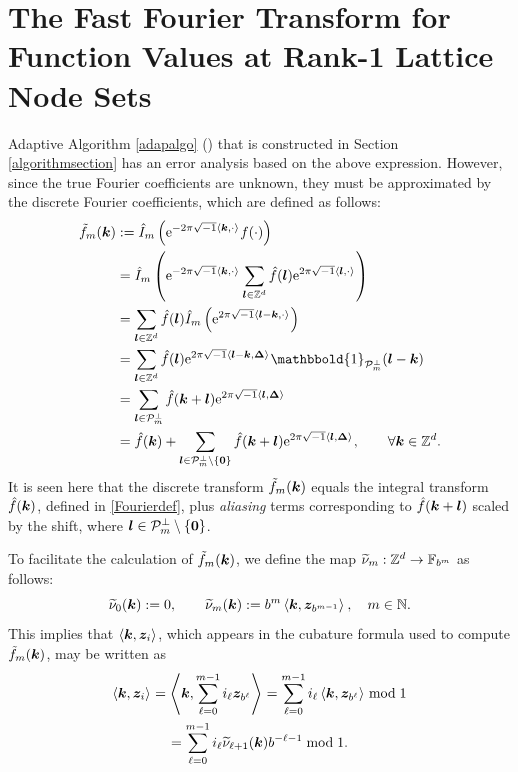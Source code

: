 \documentclass[graybox]{svmult}
\newcommand{\Z}{\mathbb{Z}} %
\newcommand{\N}{\mathbb{N}} %
\newcommand{\F}{\mathbb{F}} %
\newcommand{\bszero}{\boldsymbol{0}} %
\newcommand{\bsz}{\boldsymbol{z}}    %
\newcommand{\bsDelta}{\boldsymbol{\Delta}}    %
\newcommand{\ind}{\mathbbold{1}}
\begin{document}
\section{The Fast Fourier Transform for Function Values at Rank-1 Lattice Node Sets}\label{FFT}

Adaptive Algorithm \ref{adapalgo} (\cublat) that is constructed in Section \ref{algorithmsection} has an error analysis based on the above expression.  However, since the true Fourier coefficients are unknown, they must be approximated by the discrete Fourier coefficients, which are defined as follows:
\begin{subequations} \label{tfdefalias}
\begin{align}
\tf_m(\bsk)
&:= \hI_m\left( \E^{-2 \pi \sqrt{-1} \ip{\bsk}{\cdot}} f(\cdot) \right) \label{tfdef}\\
\nonumber
& = \hI_m\left( \E^{-2 \pi \sqrt{-1} \ip{\bsk}{\cdot}} \sum_{\bsl \in \Z^d} \hf(\bsl) \E^{2 \pi \sqrt{-1} \ip{\bsl}{\cdot}}  \right) \\
\nonumber
& = \sum_{\bsl \in \Z^d} \hf(\bsl) \hI_m\left( \E^{2 \pi \sqrt{-1} \ip{\bsl-\bsk}{\cdot}}  \right) \\
\nonumber
& = \sum_{\bsl \in \Z^d} \hf(\bsl) \E^{2 \pi \sqrt{-1} \ip{\bsl - \bsk}{\bsDelta}} \ind_{\cp_m^{\perp}}(\bsl - \bsk) \\
\nonumber
& = \sum_{\bsl \in \cp^{\perp}_m} \hf(\bsk+\bsl) \E^{2 \pi \sqrt{-1} \ip{\bsl }{\bsDelta}} \\
&= \hf(\bsk) + \sum_{\bsl \in \cp^{\perp}_m\setminus \{\bszero\}} \hf(\bsk+\bsl) \E^{2 \pi \sqrt{-1} \ip{\bsl }{\bsDelta}}, \qquad \forall \bsk \in \Z^d. \label{tfassum}
\end{align}
\end{subequations}
It is seen here that the discrete transform $\tilde{f}_m(\boldsymbol{k})$ equals the integral transform $\hat{f}(\boldsymbol{k})$, defined in \eqref{Fourierdef}, plus \emph{aliasing} terms corresponding to $\hat{f}(\boldsymbol{k}+\boldsymbol{l})$ scaled by the shift, where $\bsl \in \cp_{m}^{\perp}\setminus \left\{\bszero\right\}$.


To facilitate the calculation of $\tilde{f}_m(\boldsymbol{k})$, we define the map $\tnu_m : \Z^d \to \F_{b^m}$ as follows:
\begin{equation} \label{kdotzbm}
\tnu_{0}(\bsk) := 0, \qquad
\tnu_{m}(\bsk) := b^{m} \ip{\bsk}{\bsz_{b^{m-1}}}, \quad m \in \N.
\end{equation}
This implies that $\ip{\bsk}{\bsz_i}$, which appears in the cubature formula used to compute $\tilde{f}_m(\boldsymbol{k})$, may be written as
\begin{multline} \label{kdotzi}
\ip{\bsk}{\bsz_i} = \ip{\bsk}{\sum_{\ell=0}^{m-1} i_\ell \bsz_{b^{\ell}}} = \sum_{\ell=0}^{m-1} i_\ell \ip{\bsk}{\bsz_{b^{\ell}}} \bmod 1 \\
=\sum_{\ell=0}^{m-1} i_\ell \tnu_{\ell+1}(\bsk)  b^{-\ell-1} \bmod 1.
\end{multline}
\end{document}
